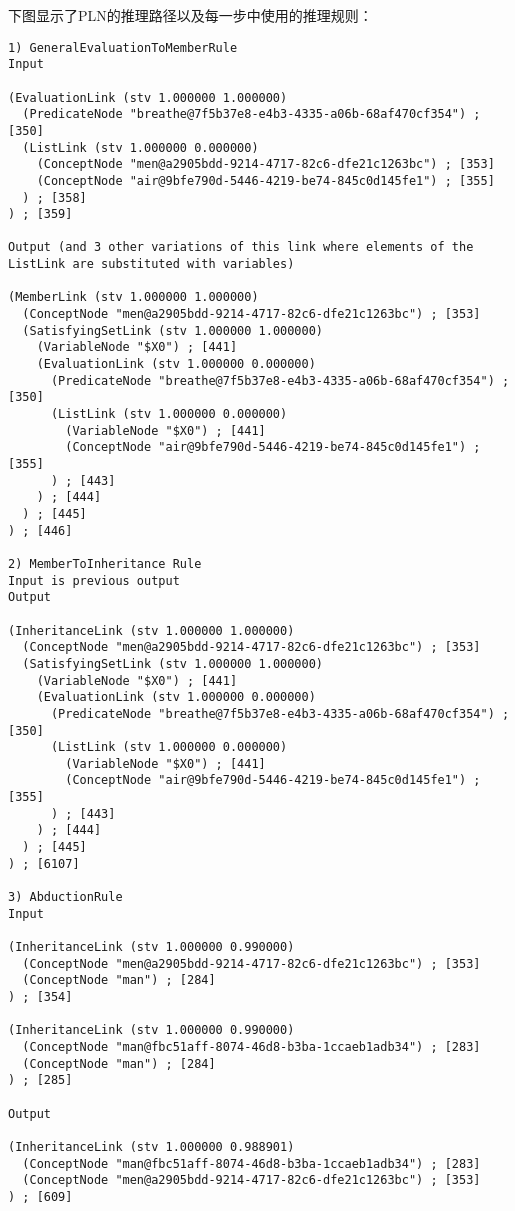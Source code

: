 下图显示了PLN的推理路径以及每一步中使用的推理规则：

{\tt\begin{small}\begin{lstlisting}
1) GeneralEvaluationToMemberRule
Input

(EvaluationLink (stv 1.000000 1.000000)
  (PredicateNode "breathe@7f5b37e8-e4b3-4335-a06b-68af470cf354") ; [350]
  (ListLink (stv 1.000000 0.000000)
    (ConceptNode "men@a2905bdd-9214-4717-82c6-dfe21c1263bc") ; [353]
    (ConceptNode "air@9bfe790d-5446-4219-be74-845c0d145fe1") ; [355]
  ) ; [358]
) ; [359]

Output (and 3 other variations of this link where elements of the ListLink are substituted with variables)

(MemberLink (stv 1.000000 1.000000)
  (ConceptNode "men@a2905bdd-9214-4717-82c6-dfe21c1263bc") ; [353]
  (SatisfyingSetLink (stv 1.000000 1.000000)
    (VariableNode "$X0") ; [441]
    (EvaluationLink (stv 1.000000 0.000000)
      (PredicateNode "breathe@7f5b37e8-e4b3-4335-a06b-68af470cf354") ; [350]
      (ListLink (stv 1.000000 0.000000)
        (VariableNode "$X0") ; [441]
        (ConceptNode "air@9bfe790d-5446-4219-be74-845c0d145fe1") ; [355]
      ) ; [443]
    ) ; [444]
  ) ; [445]
) ; [446]

2) MemberToInheritance Rule
Input is previous output
Output

(InheritanceLink (stv 1.000000 1.000000)
  (ConceptNode "men@a2905bdd-9214-4717-82c6-dfe21c1263bc") ; [353]
  (SatisfyingSetLink (stv 1.000000 1.000000)
    (VariableNode "$X0") ; [441]
    (EvaluationLink (stv 1.000000 0.000000)
      (PredicateNode "breathe@7f5b37e8-e4b3-4335-a06b-68af470cf354") ; [350]
      (ListLink (stv 1.000000 0.000000)
        (VariableNode "$X0") ; [441]
        (ConceptNode "air@9bfe790d-5446-4219-be74-845c0d145fe1") ; [355]
      ) ; [443]
    ) ; [444]
  ) ; [445]
) ; [6107]

3) AbductionRule
Input

(InheritanceLink (stv 1.000000 0.990000)
  (ConceptNode "men@a2905bdd-9214-4717-82c6-dfe21c1263bc") ; [353]
  (ConceptNode "man") ; [284]
) ; [354]

(InheritanceLink (stv 1.000000 0.990000)
  (ConceptNode "man@fbc51aff-8074-46d8-b3ba-1ccaeb1adb34") ; [283]
  (ConceptNode "man") ; [284]
) ; [285]

Output

(InheritanceLink (stv 1.000000 0.988901)
  (ConceptNode "man@fbc51aff-8074-46d8-b3ba-1ccaeb1adb34") ; [283]
  (ConceptNode "men@a2905bdd-9214-4717-82c6-dfe21c1263bc") ; [353]
) ; [609]


\end{lstlisting}
\end{small}}
